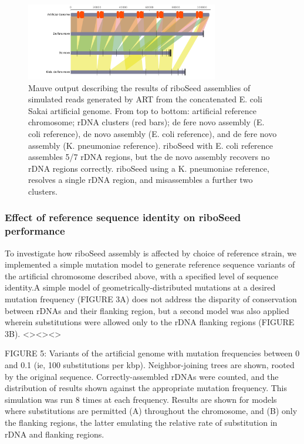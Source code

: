 \documentclass[11pt]{article}
\begin{document}
\begin{linenumbers}
\begin{figure}[H]
    \centering
    \includegraphics[width=0.75\textwidth]{PrettyMauve}
    \caption{Mauve output describing the results of riboSeed assemblies of simulated reads generated by ART from the concatenated E. coli Sakai artificial genome. From top to bottom: artificial reference chromosome; rDNA clusters (red bars); de fere novo assembly (E. coli reference), de novo assembly (E. coli reference), and de fere novo assembly (K. pneumoniae reference). riboSeed with E. coli reference assembles 5/7 rDNA regions, but the de novo assembly recovers no rDNA regions correctly. riboSeed using a K. pneumoniae reference, resolves a single rDNA region, and misassembles a further two clusters.
}
    \label{fig:artificial}
\end{figure}


\subsubsection*{Effect of reference sequence identity on riboSeed performance}
To investigate how riboSeed assembly is affected by choice of reference strain, we implemented a simple mutation model to generate reference sequence variants of the artificial chromosome described above, with a specified level of sequence identity.A simple model of geometrically-distributed mutations at a desired mutation frequency (FIGURE 3A) does not address the disparity of conservation between rDNAs and their flanking region, but a second model was also applied wherein substitutions were allowed only to the rDNA flanking regions (FIGURE 3B).
<><><>

FIGURE 5: Variants of the artificial genome with mutation frequencies between 0 and 0.1 (ie, 100 substitutions per kbp). Neighbor-joining trees are shown, rooted by the original sequence. Correctly-assembled rDNAs were counted, and the distribution of results shown against the appropriate mutation frequency. This simulation was run 8 times at each frequency. Results are shown for models where substitutions are permitted (A) throughout the chromosome, and (B) only the flanking regions, the latter emulating the relative rate of substitution in rDNA and flanking regions.



\end{linenumbers}
\end{document}
